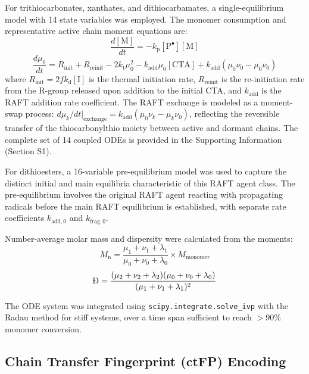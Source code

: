 \documentclass[journal=mamobx,manuscript=article]{achemso}
\begin{document}
For trithiocarbonates, xanthates, and dithiocarbamates, a single-equilibrium model with 14 state variables was employed. The monomer consumption and representative active chain moment equations are:
\begin{equation}
    \frac{d[\mathrm{M}]}{dt} = -k_\mathrm{p}[\mathrm{P}^\bullet][\mathrm{M}]
\end{equation}
\begin{equation}
    \frac{d\mu_0}{dt} = R_\mathrm{init} + R_\mathrm{reinit} - 2k_\mathrm{t}\mu_0^2 - k_\mathrm{add}\mu_0[\mathrm{CTA}] + k_\mathrm{add}(\mu_0 \nu_0 - \mu_0 \nu_0)
\end{equation}
where $R_\mathrm{init} = 2fk_\mathrm{d}[\mathrm{I}]$ is the thermal initiation rate, $R_\mathrm{reinit}$ is the re-initiation rate from the R-group released upon addition to the initial CTA, and $k_\mathrm{add}$ is the RAFT addition rate coefficient. The RAFT exchange is modeled as a moment-swap process: $d\mu_k/dt|_\mathrm{exchange} = k_\mathrm{add}(\mu_0 \nu_k - \mu_k \nu_0)$, reflecting the reversible transfer of the thiocarbonylthio moiety between active and dormant chains. The complete set of 14 coupled ODEs is provided in the Supporting Information (Section S1).

For dithioesters, a 16-variable pre-equilibrium model was used to capture the distinct initial and main equilibria characteristic of this RAFT agent class.\cite{BarnerKowollik2006} The pre-equilibrium involves the original RAFT agent reacting with propagating radicals before the main RAFT equilibrium is established, with separate rate coefficients $k_\mathrm{add,0}$ and $k_\mathrm{frag,0}$.

Number-average molar mass and dispersity were calculated from the moments:
\begin{equation}
    M_\mathrm{n} = \frac{\mu_1 + \nu_1 + \lambda_1}{\mu_0 + \nu_0 + \lambda_0} \times M_\mathrm{monomer}
\end{equation}
\begin{equation}
    \text{\DJ} = \frac{(\mu_2 + \nu_2 + \lambda_2)(\mu_0 + \nu_0 + \lambda_0)}{(\mu_1 + \nu_1 + \lambda_1)^2}
\end{equation}

The ODE system was integrated using \texttt{scipy.integrate.solve\_ivp} with the Radau method for stiff systems, over a time span sufficient to reach $>$90\% monomer conversion.

\subsection{Chain Transfer Fingerprint (ctFP) Encoding}
\end{document}

